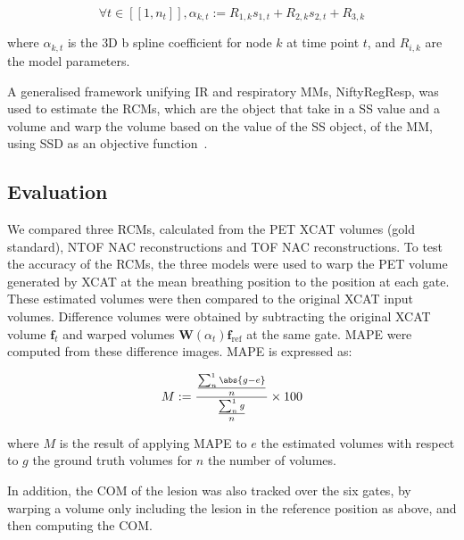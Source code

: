                 \begin{equation}
                    \forall t \in [[1,n_t]], \alpha_{k,t} := R_{1,k} s_{1,t} + R_{2,k} s_{2,t} + R_{3,k}
                \end{equation}
                
                \noindent where $\alpha_{k,t}$ is the \gls{3D} b spline coefficient for node $k$ at time point $t$, and $R_{i,k}$ are the model parameters.
            
                A generalised framework unifying \gls{IR} and respiratory \gls{MM}s, NiftyRegResp, was used to estimate the \gls{RCM}s, which are the object that take in a \gls{SS} value and a volume and warp the volume based on the value of the \gls{SS} object, of the \gls{MM}, using \gls{SSD} as an objective function~.
                
            \subsection{Evaluation} \label{impact_of_tof_on_respiratory_motion_modelling_using_nac_pet_methods_evaluation}
                We compared three \gls{RCM}s, calculated from the \gls{PET} \gls{XCAT} volumes (gold standard), \gls{NTOF} \gls{NAC} reconstructions and \gls{TOF} \gls{NAC} reconstructions. To test the accuracy of the \gls{RCM}s, the three models were used to warp the \gls{PET} volume generated by \gls{XCAT} at the mean breathing position to the position at each gate. These estimated volumes were then compared to the original \gls{XCAT} input volumes. Difference volumes were obtained by subtracting the original \gls{XCAT} volume $\mathbf{f}_t$ and warped volumes $\mathbf{W}(\alpha_t) \mathbf{f}_\mathrm{ref}$ at the same gate. \gls{MAPE} were computed from these difference images. \gls{MAPE} is expressed as:
                
                \begin{equation}
                    M := \frac{\frac{\sum_{n}^{1}\abs{g - e}}{n}}{\frac{\sum_{n}^{1}g}{n}} \times 100
                \end{equation}
                
                \noindent where $M$ is the result of applying \gls{MAPE} to $e$ the estimated volumes with respect to $g$ the ground truth volumes for $n$ the number of volumes.
                
                In addition, the \gls{COM} of the lesion was also tracked over the six gates, by warping a volume only including the lesion in the reference position as above, and then computing the \gls{COM}.
            

